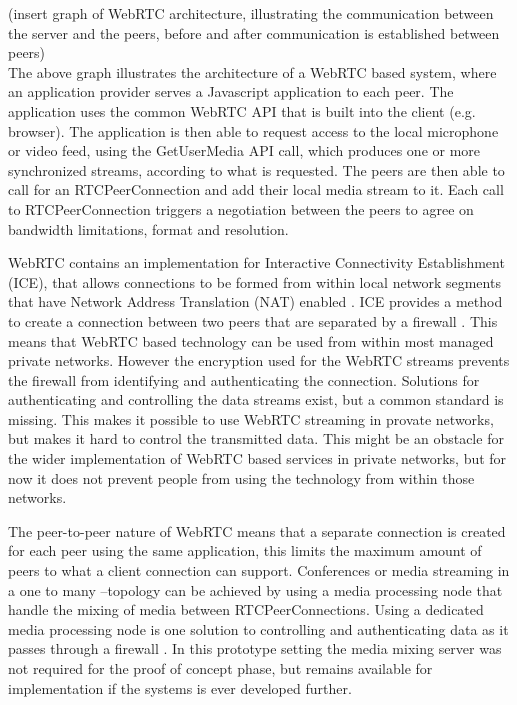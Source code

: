 \documentclass[english,12pt,a4paper,dvips]{article}
\begin{document}
(insert graph of WebRTC architecture, illustrating the communication between the server and the peers, before and after communication is established between peers)\\

The above graph illustrates the architecture of a WebRTC based system, where an application provider serves a Javascript application to each peer. The application uses the common WebRTC API that is built into the client (e.g. browser). The application is then able to request access to the local microphone or video feed, using the GetUserMedia API call, which produces one or more synchronized streams, according to what is requested. The peers are then able to call for an RTCPeerConnection and add their local media stream to it. Each call to RTCPeerConnection triggers a negotiation between the peers to agree on bandwidth limitations, format and resolution. \cite{Jennings} \cite{Garaizar}

WebRTC contains an implementation for Interactive Connectivity Establishment (ICE), that allows connections to be formed from within local network segments that have Network Address Translation (NAT) enabled \cite{Jennings} \cite{Johnston}. ICE provides a method to create a connection between two peers that are separated by a firewall \cite{Rosenberg}. This means that WebRTC based technology can be used from within most managed private networks. However the encryption used for the WebRTC streams prevents the firewall from identifying and authenticating the connection. Solutions for authenticating and controlling the data streams exist, but a common standard is missing. This makes it possible to use WebRTC streaming in provate networks, but makes it hard to control the transmitted data. \cite{Johnston} This might be an obstacle for the wider implementation of WebRTC based services in private networks, but for now it does not prevent people from using the technology from within those networks.

The peer-to-peer nature of WebRTC means that a separate connection is created for each peer using the same application, this limits the maximum amount of peers to what a client connection can support. Conferences or media streaming in a one to many --topology can be achieved by using a media processing node that handle the mixing of media between RTCPeerConnections. \cite{Jennings} Using a dedicated media processing node is one solution to controlling and authenticating data as it passes through a firewall \cite{Johnston}. In this prototype setting the media mixing server was not required for the proof of concept phase, but remains available for implementation if the systems is ever developed further. 
\end{document}
